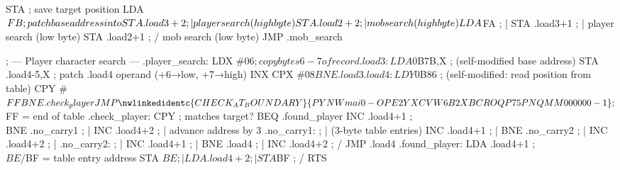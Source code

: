 \documentclass[10pt]{report}
\begin{document}
    STA                 ; save target position
    LDA     $FB                     ; \\ patch base address into
    STA     .load3+2                ;  | player search (high byte)
    STA     .load2+2                ;  | mob search (high byte)
    LDA     $FA                     ;  |
    STA     .load3+1                ;  | player search (low byte)
    STA     .load2+1                ; / mob search (low byte)
    JMP     .mob_search

    ; --- Player character search ---
.player_search:
    LDX     #$06                    ; copy bytes 6-7 of record
.load3:
    LDA     $0B7B,X                 ; (self-modified base address)
    STA     .load4-5,X              ; patch .load4 operand (+6→low, +7→high)
    INX
    CPX     #$08
    BNE     .load3
.load4:
    LDY     $0B86                   ; (self-modified: read position from table)
    CPY     #$FF
    BNE     .check_player
    JMP     \nwlinkedidentc{CHECK_AT_BOUNDARY}{PYNWmai0-OPE2YXCVW6B2XBCROQP75PNQMM000000-1}      ; $FF = end of table
.check_player:
    CPY                 ; matches target?
    BEQ     .found_player
    INC     .load4+1                ; \\
    BNE     .no_carry1              ;  |
    INC     .load4+2                ;  | advance address by 3
.no_carry1:                         ;  | (3-byte table entries)
    INC     .load4+1                ;  |
    BNE     .no_carry2              ;  |
    INC     .load4+2                ;  |
.no_carry2:                         ;  |
    INC     .load4+1                ;  |
    BNE     .load4                  ;  |
    INC     .load4+2                ; /
    JMP     .load4
.found_player:
    LDA     .load4+1                ; \\ $BE/$BF = table entry address
    STA     $BE                     ;  |
    LDA     .load4+2                ;  |
    STA     $BF                     ; /
    RTS
\end{document}
